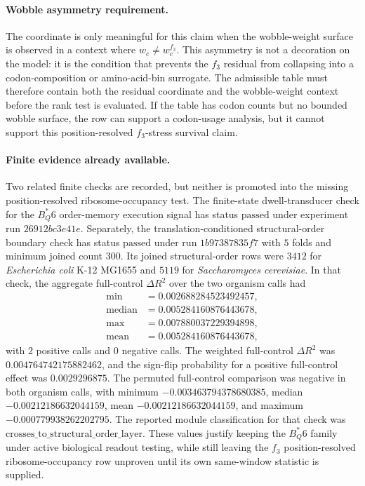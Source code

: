 \paragraph{Wobble asymmetry requirement.}
The coordinate is only meaningful for this claim when the wobble-weight surface is observed in a context where $w_c \ne w_c^{f_3}$.  This asymmetry is not a decoration on the model: it is the condition that prevents the $f_3$ residual from collapsing into a codon-composition or amino-acid-bin surrogate.  The admissible table must therefore contain both the residual coordinate and the wobble-weight context before the rank test is evaluated.  If the table has codon counts but no bounded wobble surface, the row can support a codon-usage analysis, but it cannot support this position-resolved $f_3$-stress survival claim.

\paragraph{Finite evidence already available.}
Two related finite checks are recorded, but neither is promoted into the missing position-resolved ribosome-occupancy test.  The finite-state dwell-transducer check for the $B^*_Q6$ order-memory execution signal has status $\mathrm{passed}$ under experiment run $26912bc3e41e$.  Separately, the translation-conditioned structural-order boundary check has status $\mathrm{passed}$ under run $1b97387835f7$ with $5$ folds and minimum joined count $300$.  Its joined structural-order rows were $3412$ for \emph{Escherichia coli} K-12 MG1655 and $5119$ for \emph{Saccharomyces cerevisiae}.  In that check, the aggregate full-control $\Delta R^2$ over the two organism calls had
$$
\begin{aligned}
\min &= 0.002688284523492457,\\
\mathrm{median} &= 0.005284160876443678,\\
\max &= 0.007880037229394898,\\
\mathrm{mean} &= 0.005284160876443678,
\end{aligned}
$$
with $2$ positive calls and $0$ negative calls.  The weighted full-control $\Delta R^2$ was $0.004764742175882462$, and the sign-flip probability for a positive full-control effect was $0.0029296875$.  The permuted full-control comparison was negative in both organism calls, with minimum $-0.003463794378680385$, median $-0.00212186632044159$, mean $-0.00212186632044159$, and maximum $-0.000779938262202795$.  The reported module classification for that check was $\mathrm{crosses\_to\_structural\_order\_layer}$.  These values justify keeping the $B^*_Q6$ family under active biological readout testing, while still leaving the $f_3$ position-resolved ribosome-occupancy row unproven until its own same-window statistic is supplied.

